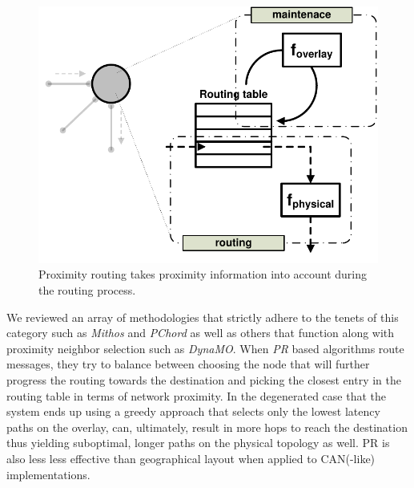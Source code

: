\begin{figure}[ht]
\centering
  \includegraphics[scale=0.4]{img/pdf/proximity-routing.pdf}
\caption{Proximity routing takes proximity information into account during the
routing process.}
\label{figure:proximity-routing}
\end{figure}
We reviewed an array of methodologies that strictly adhere to 
the tenets of this category such as \emph{Mithos} and
\emph{PChord} as well as others that function along with 
proximity neighbor selection such as \emph{DynaMO}.
When \emph{PR} based algorithms route messages, they try to balance between
choosing the node that will further progress the routing towards the
destination and picking the closest entry in the routing table
in terms of network proximity. 
In the degenerated case that the system ends up using a greedy approach that
selects only the lowest latency paths on the overlay, can, ultimately, result in
more hops to reach the destination thus yielding suboptimal, longer paths on
the physical topology as well. PR is also less less effective than geographical
layout when applied to CAN(-like) implementations.



